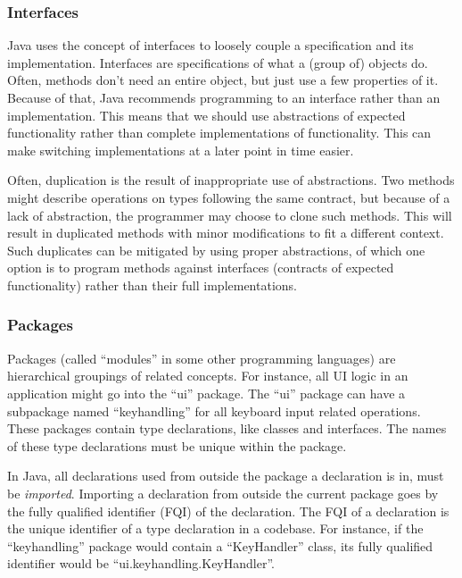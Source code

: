 \subsubsection{Interfaces}
Java uses the concept of interfaces to loosely couple a specification and its implementation. Interfaces are specifications of what a (group of) objects do. Often, methods don't need an entire object, but just use a few properties of it. Because of that, Java recommends programming to an interface rather than an implementation. This means that we should use abstractions of expected functionality rather than complete implementations of functionality. This can make switching implementations at a later point in time easier.

Often, duplication is the result of inappropriate use of abstractions. Two methods might describe operations on types following the same contract, but because of a lack of abstraction, the programmer may choose to clone such methods. This will result in duplicated methods with minor modifications to fit a different context. Such duplicates can be mitigated by using proper abstractions, of which one option is to program methods against interfaces (contracts of expected functionality) rather than their full implementations.

\subsubsection{Packages}
Packages (called ``modules'' in some other programming languages) are hierarchical groupings of related concepts. For instance, all UI logic in an application might go into the ``ui'' package. The ``ui'' package can have a subpackage named ``keyhandling'' for all keyboard input related operations. These packages contain type declarations, like classes and interfaces. The names of these type declarations must be unique within the package. %

In Java, all declarations used from outside the package a declaration is in, must be \textit{imported}. Importing a declaration from outside the current package goes by the fully qualified identifier (FQI) of the declaration. The FQI of a declaration is the unique identifier of a type declaration in a codebase. For instance, if the ``keyhandling'' package would contain a ``KeyHandler'' class, its fully qualified identifier would be ``ui.keyhandling.KeyHandler''.

